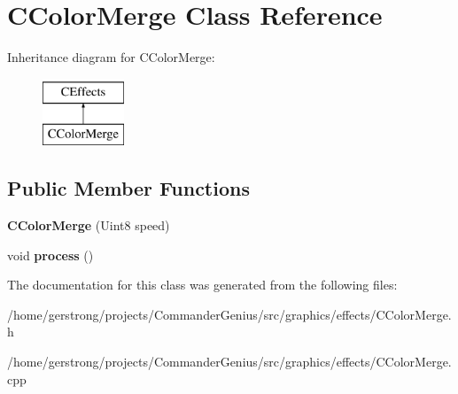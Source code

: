 \hypertarget{class_c_color_merge}{
\section{CColorMerge Class Reference}
\label{class_c_color_merge}
}
Inheritance diagram for CColorMerge:\begin{figure}[H]
\begin{center}
\leavevmode
\includegraphics[height=2cm]{class_c_color_merge}
\end{center}
\end{figure}
\subsection*{Public Member Functions}
\begin{DoxyCompactItemize}
\item 
\hypertarget{class_c_color_merge_a4753c2710ac116a46b89c7f2a4a8134a}{
{\bfseries CColorMerge} (Uint8 speed)}
\label{class_c_color_merge_a4753c2710ac116a46b89c7f2a4a8134a}

\item 
\hypertarget{class_c_color_merge_a9ae5d36c16489cb27b4d0df02af7607c}{
void {\bfseries process} ()}
\label{class_c_color_merge_a9ae5d36c16489cb27b4d0df02af7607c}

\end{DoxyCompactItemize}


The documentation for this class was generated from the following files:\begin{DoxyCompactItemize}
\item 
/home/gerstrong/projects/CommanderGenius/src/graphics/effects/CColorMerge.h\item 
/home/gerstrong/projects/CommanderGenius/src/graphics/effects/CColorMerge.cpp\end{DoxyCompactItemize}

